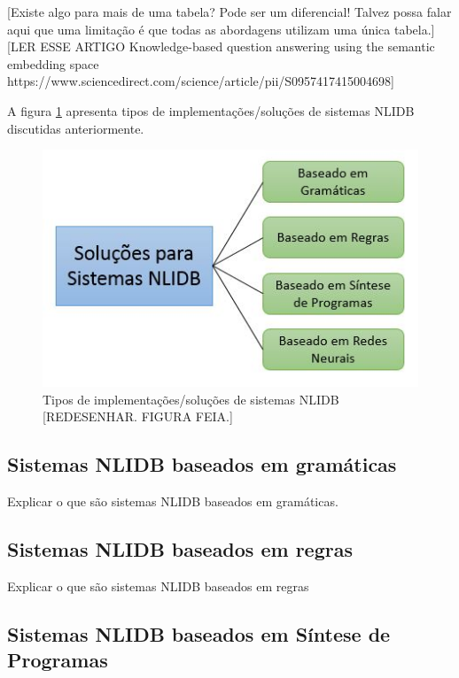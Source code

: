 \documentclass{article}
\begin{document}
[Existe algo para mais de uma tabela? Pode ser um diferencial! Talvez possa falar aqui que uma limitação é que todas as abordagens utilizam uma única tabela.]\\

[LER ESSE ARTIGO
Knowledge-based question answering using the semantic embedding space https://www.sciencedirect.com/science/article/pii/S0957417415004698]


A figura \ref{fig:SistemaNLIDB} apresenta tipos de implementações/soluções de sistemas NLIDB discutidas anteriormente.

\begin{figure}[h!]
\centering
\includegraphics[scale=0.7]{NLIDB.JPG}
\caption{Tipos de implementações/soluções de sistemas NLIDB [REDESENHAR. FIGURA FEIA.]}
\label{fig:SistemaNLIDB}
\end{figure}

\subsection{Sistemas NLIDB baseados em gramáticas}

Explicar o que são sistemas NLIDB baseados em gramáticas.

\subsection{Sistemas NLIDB baseados em regras}

Explicar o que são sistemas NLIDB baseados em regras\\

\subsection{Sistemas NLIDB baseados em Síntese de Programas}
\end{document}
